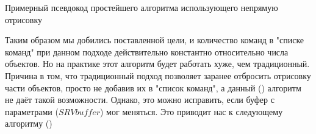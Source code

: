 	\begin{algorithm} %
		\nonl{}
		\caption{Примерный псевдокод простейшего алгоритма использующего непрямую отрисовку}\label{alg:simpleIndirect}
	\end{algorithm}
	\FloatBarrier
	
	Таким образом мы добились поставленной цели, и количество команд в "списке команд" при данном подходе действительно константно относительно числа объектов. Но на практике этот алгоритм будет работать хуже, чем традиционный. Причина в том, что традиционный подход позволяет заранее отбросить отрисовку части объектов, просто не добавив их в "список команд", а данный () алгоритм не даёт такой возможности. Однако, это можно исправить, если буфер с параметрами ($SRVbuffer$) мог меняться. Это приводит нас к следующему алгоритму ()
	
